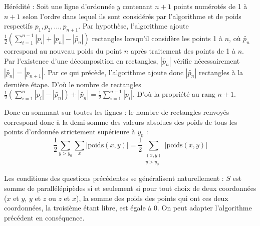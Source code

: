 Hérédité : Soit une ligne d'ordonnée $y$ contenant $n+1$ points numérotés de 1 à $n+1$ selon l'ordre dans lequel ils sont considérés par l'algorithme et de poids respectifs $p_1, p_2, ..., p_{n+1}$. Par hypothèse, l'algorithme ajoute $\frac{1}{2} \left(\sum_{i=1}^{n-1}|p_i|+|p_n|-|\tilde{p_n}|\right)$ rectangles lorsqu'il considère les points 1 à $n$, où $\tilde{p_n}$ correspond au nouveau poids du point $n$ après traitement des points de 1 à $n$. Par l'existence d'une décomposition en rectangles, $|\tilde{p_n}|$ vérifie nécessairement $|\tilde{p_n}|=|p_{n+1}|$. Par ce qui précède, l'algorithme ajoute donc $|\tilde{p_n}|$ rectangles à la dernière étape. D'où le nombre de rectangles $\frac{1}{2} \left(\sum_{i=1}^{n}|p_i|-|\tilde{p_n}|\right)+|\tilde{p_n}|=\frac{1}{2}\sum_{i=1}^{n+1}|p_i|$. D'où la propriété au rang $n+1$.
\medskip

Donc en sommant sur toutes les lignes : le nombre de rectangles renvoyés correspond donc à la demi-somme des valeurs absolues des poids de tous les points d'ordonnée strictement supérieure à $y_0$ :
\[
    \frac{1}{2} \sum_{y>y_0}\sum_{x}|\textrm{poids}(x,y)|=\frac{1}{2}\sum_{\substack{(x,y) \\ y>y_0}}|\textrm{poids}(x,y)|
\]

\Q
Les conditions des questions précédentes se généralisent naturellement : $S$ est somme de parallélépipèdes si et seulement si pour tout choix de deux coordonnées ($x$ et $y$, $y$ et $z$ ou $z$ et $x$), la somme des poids des points qui ont ces deux coordonnées, la troisième étant libre, est égale à 0. On peut adapter l'algorithme précédent en conséquence.
\bigskip

\Fin
